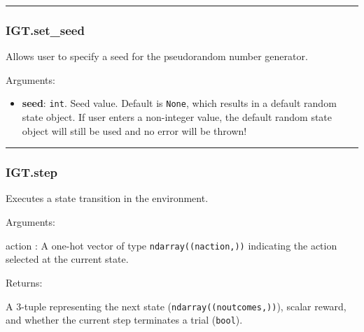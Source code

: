 \begin{center}\rule{0.5\linewidth}{\linethickness}\end{center}

\subsubsection{IGT.set\_seed}\label{igt.set_seed}

\begin{Shaded}
\begin{Highlighting}[]
\OperatorTok{=}\NormalTok{)}
\end{Highlighting}
\end{Shaded}

Allows user to specify a seed for the pseudorandom number generator.

Arguments:

\begin{itemize}
\tightlist
\item
  \textbf{seed}: \texttt{int}. Seed value. Default is \texttt{None},
  which results in a default random state object. If user enters a
  non-integer value, the default random state object will still be used
  and no error will be thrown!
\end{itemize}

\begin{center}\rule{0.5\linewidth}{\linethickness}\end{center}

\subsubsection{IGT.step}\label{igt.step}

\begin{Shaded}
\begin{Highlighting}[]
\end{Highlighting}
\end{Shaded}

Executes a state transition in the environment.

Arguments:

action : A one-hot vector of type \texttt{ndarray((naction,))}
indicating the action selected at the current state.

Returns:

A 3-tuple representing the next state (\texttt{ndarray((noutcomes,))}),
scalar reward, and whether the current step terminates a trial
(\texttt{bool}).


